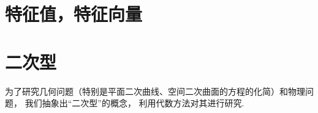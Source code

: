 \chapter{特征值，特征向量}












\chapter{二次型}
为了研究几何问题（特别是平面二次曲线、空间二次曲面的方程的化简）和物理问题，
我们抽象出“二次型”的概念，
利用代数方法对其进行研究.






